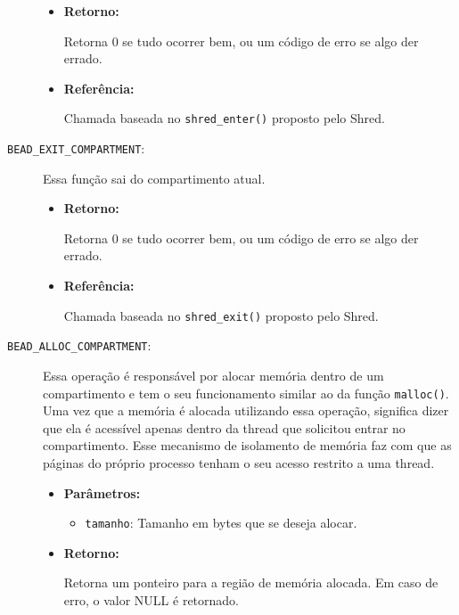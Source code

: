 \begin{description}
  \begin{itemize}
    \item \textbf{Retorno:}

Retorna 0 se tudo ocorrer bem, ou um código de erro se algo der errado.

    \item \textbf{Referência:}

Chamada baseada no \texttt{shred\_enter()} proposto pelo Shred.

\end{itemize}

  \item [\texttt{BEAD\_EXIT\_COMPARTMENT}:]

Essa função sai do compartimento atual.

  \begin{itemize}

    \item \textbf{Retorno:}

Retorna 0 se tudo ocorrer bem, ou um código de erro se algo der errado.

    \item \textbf{Referência:}

Chamada baseada no \texttt{shred\_exit()} proposto pelo Shred.

	\end{itemize}

  \item [\texttt{BEAD\_ALLOC\_COMPARTMENT}:]

Essa operação é responsável por alocar memória dentro de um compartimento e tem
o seu funcionamento similar ao da função \texttt{malloc()}. Uma vez que a
memória é alocada utilizando essa operação, significa dizer que ela é acessível
apenas dentro da thread que solicitou entrar no compartimento. Esse mecanismo
de isolamento de memória faz com que as páginas do próprio processo tenham o
seu acesso restrito a uma thread.

  \begin{itemize}
    \item \textbf{Parâmetros:}

    \begin{itemize}
      \item \texttt{tamanho}: Tamanho em bytes que se deseja alocar.
    \end{itemize}

    \item \textbf{Retorno:}

Retorna um ponteiro para a região de memória alocada. Em caso de erro, o valor
NULL é retornado.


\end{itemize}
\end{description}
